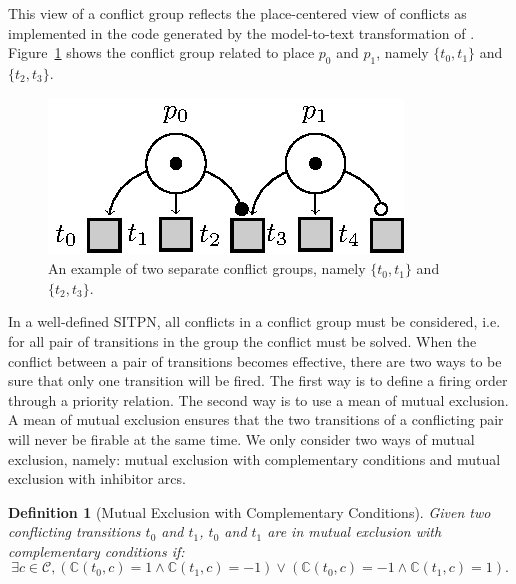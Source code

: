 \documentclass[pdflatex,sn-mathphys]{sn-jnl}%
\theoremstyle{thmstyleone}%
\theoremstyle{thmstyletwo}%
\theoremstyle{thmstylethree}%
\newtheorem{definition}{Definition}%
\begin{document}
This view of a conflict group reflects the place-centered view of
conflicts as implemented in the \vhdl{} code generated by the
model-to-text transformation of \hilecop{}.
Figure~\ref{fig:conflict-groups} shows the conflict group related to
place $p_0$ and $p_1$, namely $\{t_0,t_1\}$ and $\{t_2,t_3\}$.

\begin{figure}[H]
  \centering
  \includegraphics[keepaspectratio,width=.25\linewidth]{conflict-groups.eps}
  \caption[An example of two separate conflict groups.]{An example of
    two separate conflict groups, namely $\{t_0,t_1\}$ and
    $\{t_2,t_3\}$.}
  \label{fig:conflict-groups}
\end{figure}

In a well-defined SITPN, all conflicts in a conflict group must be
considered, i.e. for all pair of transitions in the group the conflict
must be solved. When the conflict between a pair of transitions
becomes effective, there are two ways to be sure that only one
transition will be fired. The first way is to define a firing order
through a priority relation. The second way is to use a mean of mutual
exclusion. A mean of mutual exclusion ensures that the two transitions
of a conflicting pair will never be firable at the same time. We only
consider two ways of mutual exclusion, namely: mutual exclusion with
complementary conditions and mutual exclusion with inhibitor arcs.

\begin{definition}[Mutual Exclusion with Complementary Conditions]
  \label{def:mutex-conds}
  Given two conflicting transitions $t_0$ and $t_1$, $t_0$ and $t_1$
  are in mutual exclusion with complementary conditions if:
  \begin{equation*}
    \exists{}c\in\mathcal{C},
    (\mathbb{C}(t_0,c)=1\land{}\mathbb{C}(t_1,c)=-1)
    \lor(\mathbb{C}(t_0,c)=-1\land{}\mathbb{C}(t_1,c)=1).
  \end{equation*}
\end{definition}
\end{document}

